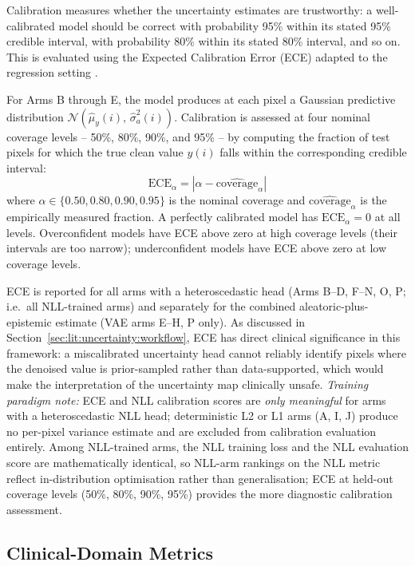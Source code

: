 \documentclass[12pt, a4paper, twoside, openright]{book}
\begin{document}
Calibration measures whether the uncertainty estimates are trustworthy: a well-calibrated
model should be correct with probability 95\% within its stated 95\% credible interval, with
probability 80\% within its stated 80\% interval, and so on. This is evaluated using the
Expected Calibration Error (ECE) adapted to the regression setting \cite{naeini_obtaining_2015}.

For Arms B through E, the model produces at each pixel a Gaussian predictive distribution
$\mathcal{N}(\hat{\mu}_y(i),\, \hat{\sigma}^2_a(i))$. Calibration is assessed at four nominal
coverage levels -- 50\%, 80\%, 90\%, and 95\% -- by computing the fraction of test pixels
for which the true clean value $y(i)$ falls within the corresponding credible interval:
\begin{equation}
\label{eq:methods:ece}
\mathrm{ECE}_\alpha = \left|\alpha - \widehat{\mathrm{coverage}}_\alpha\right|
\end{equation}
where $\alpha \in \{0.50, 0.80, 0.90, 0.95\}$ is the nominal coverage and
$\widehat{\mathrm{coverage}}_\alpha$ is the empirically measured fraction. A perfectly
calibrated model has $\mathrm{ECE}_\alpha = 0$ at all levels. Overconfident models have
ECE above zero at high coverage levels (their intervals are too narrow); underconfident models
have ECE above zero at low coverage levels.

ECE is reported for all arms with a heteroscedastic head (Arms B--D, F--N, O, P; i.e.\ all NLL-trained arms) and separately for the combined aleatoric-plus-epistemic estimate (VAE arms E--H, P only). As discussed in
Section~\ref{sec:lit:uncertainty:workflow}, ECE has direct clinical significance in this framework:
a miscalibrated uncertainty head cannot reliably identify pixels where the denoised value
is prior-sampled rather than data-supported, which would make the interpretation of the
uncertainty map clinically unsafe. \textit{Training paradigm note:} ECE and NLL calibration scores are \emph{only meaningful} for arms with a heteroscedastic NLL head; deterministic L2 or L1 arms (A, I, J) produce no per-pixel variance estimate and are excluded from calibration evaluation entirely. Among NLL-trained arms, the NLL training loss and the NLL evaluation score are mathematically identical, so NLL-arm rankings on the NLL metric reflect in-distribution optimisation rather than generalisation; ECE at held-out coverage levels (50\%, 80\%, 90\%, 95\%) provides the more diagnostic calibration assessment.

\subsection{Clinical-Domain Metrics}
\label{sec:methods:evaluation:clinical}
\end{document}
